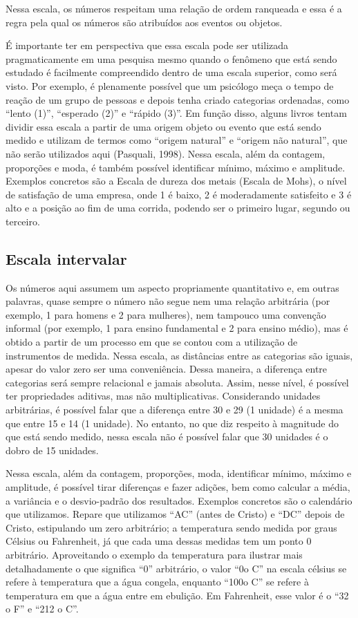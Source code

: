 \documentclass[
]{book}
\begin{document}
Nessa escala, os números respeitam uma relação de ordem ranqueada e essa
é a regra pela qual os números são atribuídos aos eventos ou objetos.

É importante ter em perspectiva que essa escala pode ser utilizada
pragmaticamente em uma pesquisa mesmo quando o fenômeno que está sendo
estudado é facilmente compreendido dentro de uma escala superior, como
será visto. Por exemplo, é plenamente possível que um psicólogo meça o
tempo de reação de um grupo de pessoas e depois tenha criado categorias
ordenadas, como ``lento (1)'', ``esperado (2)'' e ``rápido (3)''. Em
função disso, alguns livros tentam dividir essa escala a partir de uma
origem objeto ou evento que está sendo medido e utilizam de termos como
``origem natural'' e ``origem não natural'', que não serão utilizados
aqui (Pasquali, 1998). Nessa escala, além da contagem, proporções e
moda, é também possível identificar mínimo, máximo e amplitude. Exemplos
concretos são a Escala de dureza dos metais (Escala de Mohs), o nível de
satisfação de uma empresa, onde 1 é baixo, 2 é moderadamente satisfeito
e 3 é alto e a posição ao fim de uma corrida, podendo ser o primeiro
lugar, segundo ou terceiro.

\hypertarget{escala-intervalar}{%
\subsection{Escala intervalar}\label{escala-intervalar}}

Os números aqui assumem um aspecto propriamente quantitativo e, em
outras palavras, quase sempre o número não segue nem uma relação
arbitrária (por exemplo, 1 para homens e 2 para mulheres), nem tampouco
uma convenção informal (por exemplo, 1 para ensino fundamental e 2 para
ensino médio), mas é obtido a partir de um processo em que se contou com
a utilização de instrumentos de medida. Nessa escala, as distâncias
entre as categorias são iguais, apesar do valor zero ser uma
conveniência. Dessa maneira, a diferença entre categorias será sempre
relacional e jamais absoluta. Assim, nesse nível, é possível ter
propriedades aditivas, mas não multiplicativas. Considerando unidades
arbitrárias, é possível falar que a diferença entre 30 e 29 (1 unidade)
é a mesma que entre 15 e 14 (1 unidade). No entanto, no que diz respeito
à magnitude do que está sendo medido, nessa escala não é possível falar
que 30 unidades é o dobro de 15 unidades.

Nessa escala, além da contagem, proporções, moda, identificar mínimo,
máximo e amplitude, é possível tirar diferenças e fazer adições, bem
como calcular a média, a variância e o desvio-padrão dos resultados.
Exemplos concretos são o calendário que utilizamos. Repare que
utilizamos ``AC'' (antes de Cristo) e ``DC'' depois de Cristo,
estipulando um zero arbitrário; a temperatura sendo medida por graus
Célsius ou Fahrenheit, já que cada uma dessas medidas tem um ponto 0
arbitrário. Aproveitando o exemplo da temperatura para ilustrar mais
detalhadamente o que significa ``0'' arbitrário, o valor ``0o C'' na
escala célsius se refere à temperatura que a água congela, enquanto
``100o C'' se refere à temperatura em que a água entre em ebulição. Em
Fahrenheit, esse valor é o ``32 o F'' e ``212 o C''.
\end{document}
